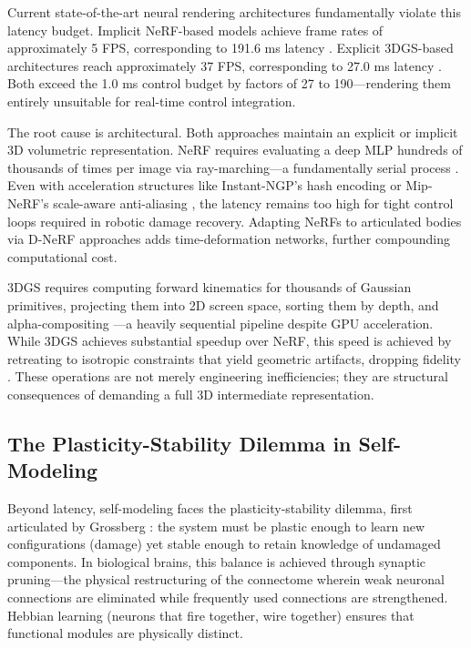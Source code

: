 \documentclass[12pt,a4paper,oneside]{report}
\begin{document}
Current state-of-the-art neural rendering architectures fundamentally violate this latency budget. Implicit NeRF-based models achieve frame rates of approximately 5 FPS, corresponding to 191.6 ms latency \cite{hu2024teaching}. Explicit 3DGS-based architectures reach approximately 37 FPS, corresponding to 27.0 ms latency \cite{hu2025learning}. Both exceed the 1.0 ms control budget by factors of 27 to 190—rendering them entirely unsuitable for real-time control integration.

The root cause is architectural. Both approaches maintain an explicit or implicit 3D volumetric representation. NeRF requires evaluating a deep MLP hundreds of thousands of times per image via ray-marching—a fundamentally serial process \cite{mildenhall2020nerf}. Even with acceleration structures like Instant-NGP's hash encoding \cite{muller2022instant} or Mip-NeRF's scale-aware anti-aliasing \cite{barron2021mip}, the latency remains too high for tight control loops required in robotic damage recovery. Adapting NeRFs to articulated bodies via D-NeRF approaches \cite{pumarola2021d} adds time-deformation networks, further compounding computational cost.

3DGS requires computing forward kinematics for thousands of Gaussian primitives, projecting them into 2D screen space, sorting them by depth, and alpha-compositing \cite{kerbl20233d}—a heavily sequential pipeline despite GPU acceleration. While 3DGS achieves substantial speedup over NeRF, this speed is achieved by retreating to isotropic constraints that yield geometric artifacts, dropping fidelity \cite{hu2025learning}. These operations are not merely engineering inefficiencies; they are structural consequences of demanding a full 3D intermediate representation.

\subsection{The Plasticity-Stability Dilemma in Self-Modeling}

Beyond latency, self-modeling faces the plasticity-stability dilemma, first articulated by Grossberg \cite{grossberg1987competitive}: the system must be plastic enough to learn new configurations (damage) yet stable enough to retain knowledge of undamaged components. In biological brains, this balance is achieved through synaptic pruning—the physical restructuring of the connectome wherein weak neuronal connections are eliminated while frequently used connections are strengthened. Hebbian learning (neurons that fire together, wire together) ensures that functional modules are physically distinct.
\end{document}
